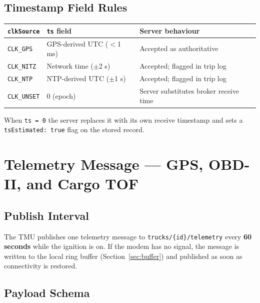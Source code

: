 \documentclass{article}
\begin{document}
\subsection{Timestamp Field Rules}

\begin{center}
\begin{tabular}{lll}
\toprule
\textbf{\texttt{clkSource}} & \textbf{\texttt{ts} field} & \textbf{Server behaviour}\\
\midrule
\texttt{CLK\_GPS}   & GPS-derived UTC ($<$1 ms)   & Accepted as authoritative\\
\texttt{CLK\_NITZ}  & Network time ($\pm$2 s)     & Accepted; flagged in trip log\\
\texttt{CLK\_NTP}   & NTP-derived UTC ($\pm$1 s)  & Accepted; flagged in trip log\\
\texttt{CLK\_UNSET} & 0 (epoch)                   & Server substitutes broker receive time\\
\bottomrule
\end{tabular}
\end{center}

\noindent When \texttt{ts = 0} the server replaces it with its own receive
timestamp and sets a \texttt{tsEstimated: true} flag on the stored record.

\section{Telemetry Message --- GPS, OBD-II, and Cargo TOF}

\subsection{Publish Interval}

The TMU publishes one telemetry message to \texttt{trucks/\{id\}/telemetry}
every \textbf{60 seconds} while the ignition is on. If the modem has no signal,
the message is written to the local ring buffer (Section~\ref{sec:buffer}) and
published as soon as connectivity is restored.

\subsection{Payload Schema}
\end{document}
